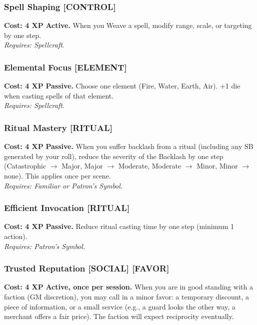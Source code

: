\subsubsection*{Spell Shaping \textnormal{[CONTROL]}}
\label{talent:spell-shaping}
\textbf{Cost: 4 XP} \textbf{Active.} When you Weave a spell, modify range, scale, or targeting by one step. \\
\textit{Requires: Spellcraft.}

\subsubsection*{Elemental Focus \textnormal{[ELEMENT]}}
\label{talent:elemental-focus}
\textbf{Cost: 4 XP} \textbf{Passive.} Choose one element (Fire, Water, Earth, Air). +1 die when casting spells of that element. \\
\textit{Requires: Spellcraft.}

\subsubsection*{Ritual Mastery \textnormal{[RITUAL]}}
\label{talent:ritual-mastery}
\textbf{Cost: 4 XP} \textbf{Passive.} When you suffer backlash from a ritual (including any SB generated by your roll), reduce the severity of the Backlash by one step (Catastrophic $\rightarrow$ Major, Major $\rightarrow$ Moderate, Moderate $\rightarrow$ Minor, Minor $\rightarrow$ none). This applies once per scene. \\
\textit{Requires: Familiar or Patron's Symbol.}

\subsubsection*{Efficient Invocation \textnormal{[RITUAL]}}
\label{talent:efficient-invocation}
\textbf{Cost: 4 XP} \textbf{Passive.} Reduce ritual casting time by one step (minimum 1 action). \\
\textit{Requires: Patron's Symbol.}

\subsubsection*{Trusted Reputation \textnormal{[SOCIAL] [FAVOR]}}
\label{talent:trusted-reputation}
\textbf{Cost: 4 XP} \textbf{Active, once per session.} When you are in good standing with a faction (GM discretion), you may call in a minor favor: a temporary discount, a piece of information, or a small service (e.g., a guard looks the other way, a merchant offers a fair price). The faction will expect reciprocity eventually.

